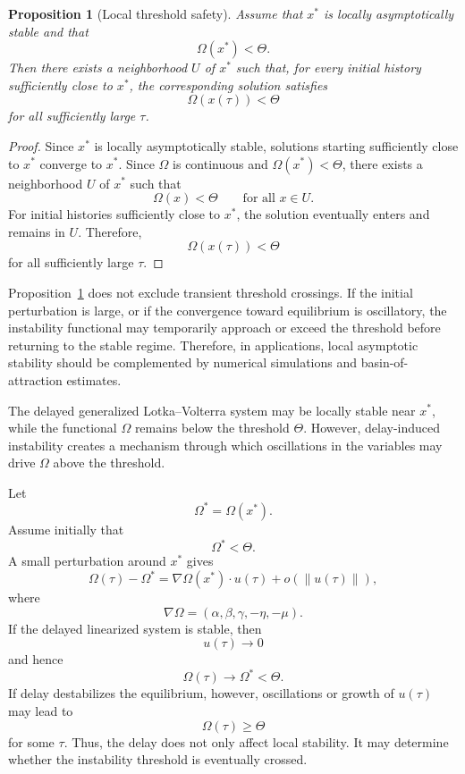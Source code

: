 \documentclass[11pt]{article}
\newtheorem{proposition}{Proposition}
\begin{document}
 \begin{proposition}[Local threshold safety]
 	\label{prop:local-threshold-safety}
 	Assume that $x^\ast$ is locally asymptotically stable and that
 	\[
 	\Omega(x^\ast)<\Theta.
 	\]
 	Then there exists a neighborhood $U$ of $x^\ast$ such that, for every initial
 	history sufficiently close to $x^\ast$, the corresponding solution satisfies
 	\[
 	\Omega(x(\tau))<\Theta
 	\]
 	for all sufficiently large $\tau$.
 \end{proposition}
 
 \begin{proof}
 	Since $x^\ast$ is locally asymptotically stable, solutions starting sufficiently
 	close to $x^\ast$ converge to $x^\ast$. Since $\Omega$ is continuous and
 	$\Omega(x^\ast)<\Theta$, there exists a neighborhood $U$ of $x^\ast$ such that
 	\[
 	\Omega(x)<\Theta
 	\qquad
 	\text{for all } x\in U.
 	\]
 	For initial histories sufficiently close to $x^\ast$, the solution eventually
 	enters and remains in $U$. Therefore,
 	\[
 	\Omega(x(\tau))<\Theta
 	\]
 	for all sufficiently large $\tau$.
 \end{proof}
 
 
 	Proposition~\ref{prop:local-threshold-safety} does not exclude transient
 	threshold crossings. If the initial perturbation is large, or if the convergence
 	toward equilibrium is oscillatory, the instability functional may temporarily
 	approach or exceed the threshold before returning to the stable regime.
 	Therefore, in applications, local asymptotic stability should be complemented
 	by numerical simulations and basin-of-attraction estimates.
 

The delayed generalized Lotka--Volterra system may be locally stable near $x^\ast$, while the functional $\Omega$ remains below the threshold $\Theta$. However, delay-induced instability creates a mechanism through which oscillations in the variables may drive $\Omega$ above the threshold.

Let
\[
\Omega^\ast=\Omega(x^\ast).
\]
Assume initially that
\[
\Omega^\ast<\Theta.
\]
A small perturbation around $x^\ast$ gives
\[
\Omega(\tau)-\Omega^\ast
=
\nabla\Omega(x^\ast)\cdot u(\tau)
+
o(\|u(\tau)\|),
\]
where
\[
\nabla\Omega
=
(\alpha,\beta,\gamma,-\eta,-\mu).
\]
If the delayed linearized system is stable, then
\[
u(\tau)\to 0
\]
and hence
\[
\Omega(\tau)\to \Omega^\ast<\Theta.
\]
If delay destabilizes the equilibrium, however, oscillations or growth of $u(\tau)$ may lead to
\[
\Omega(\tau)\geq \Theta
\]
for some $\tau$. Thus, the delay does not only affect local stability. It may determine whether the instability threshold is eventually crossed.
\end{document}
